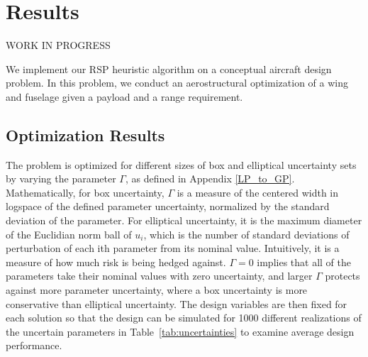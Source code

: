 \section{Results}

WORK IN PROGRESS

We implement our RSP heuristic algorithm on a conceptual  aircraft design problem.
In this problem, we conduct an aerostructural optimization of a wing and fuselage given a payload and a range requirement. 

\subsection{Optimization Results}

The problem is optimized for different sizes of box and elliptical uncertainty sets
by varying the parameter $\Gamma$, as defined in Appendix \ref{LP_to_GP}. Mathematically, for box uncertainty,
$\Gamma$ is a measure of the centered width in logspace of the defined parameter uncertainty, normalized by the
standard deviation of the parameter. For elliptical uncertainty, it is the maximum diameter of the Euclidian norm
ball of $u_i$, which is the number of standard deviations of perturbation of each ith parameter from its nominal value.
Intuitively, it is a measure of how much risk is being hedged against. $\Gamma = 0$
implies that all of the parameters take their nominal values with zero uncertainty,
and larger $\Gamma$ protects against more parameter uncertainty, where a box uncertainty is
more conservative than elliptical uncertainty.
The design variables are then fixed for each solution so that the design can be simulated for
1000 different realizations of the uncertain parameters in Table~\ref{tab:uncertainties}
to examine average design performance.\\

